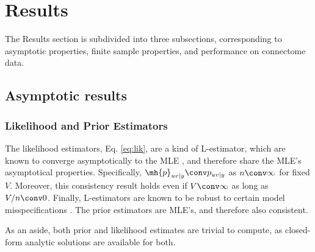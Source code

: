 \documentclass[10pt,journal,cspaper,compsoc]{IEEEtran}
\begin{document}




\section{Results} %
\label{sec:results}

The Results section is subdivided into three subsections, corresponding to asymptotic properties, finite sample properties, and performance on connectome data. 

\subsection{Asymptotic results} %
\label{sub:estimator_properties}

\subsubsection{Likelihood and Prior Estimators} %
\label{ssub:subsubsection_name4}


The likelihood estimators, Eq. \eqref{eq:lik}, are a kind of L-estimator, which are known to converge asymptotically to the MLE \cite{Huber1981}, and therefore share the MLE's asymptotical properties. Specifically, $\mh{p}_{uv|y} \conv p_{uv|y}$ as $n \conv \infty$ for fixed $V$. Moreover, this consistency result holds even if  $V \conv \infty$ as long as $V/n \conv 0$.  Finally, L-estimators are known to be robust to certain model misspecifications \cite{Huber1981}. The prior estimators are MLE's, and therefore also consistent.



As an aside, both prior and likelihood estimates are trivial to compute, as closed-form analytic solutions are available for both.  %
\end{document}
